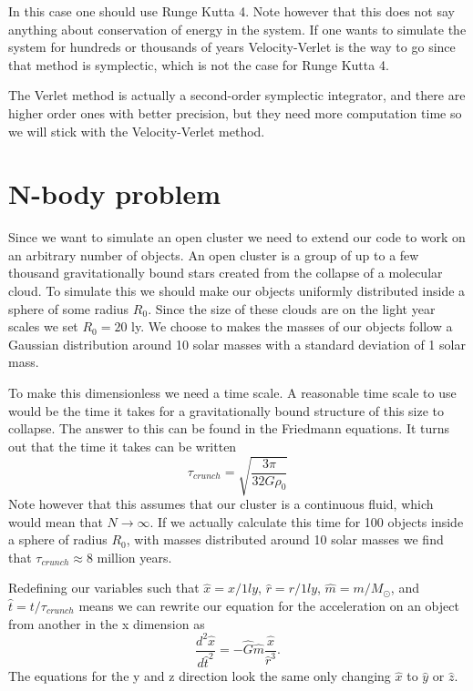 \documentclass{aa}   %
\begin{document}
In this case one should use Runge Kutta 4. Note however that this does not say anything about conservation of energy in the system. If one wants to simulate the system for hundreds or thousands of years Velocity-Verlet is the way to go since that method is symplectic, which is not the case for Runge Kutta 4. 

The Verlet method is actually a second-order symplectic integrator, and there are higher order ones with better precision, but they need more computation time so we will stick with the Velocity-Verlet method.
\section{N-body problem}    \label{sec:N-boy}
Since we want to simulate an open cluster we need to extend our code to work on an arbitrary number of objects.
An open cluster is a group of up to a few thousand gravitationally bound stars created from the collapse of a molecular cloud.
To simulate this we should make our objects uniformly distributed inside a sphere of some radius $R_0$. Since the size of these clouds are on the light year scales we set $R_0 = 20$ ly. We choose to makes the masses of our objects follow a Gaussian distribution around 10 solar masses with a standard deviation of 1 solar mass. 

To make this dimensionless we need a time scale. A reasonable time scale to use would be the time it takes for a gravitationally bound structure of this size to collapse. The answer to this can be found in the Friedmann equations.
It turns out that the time it takes can be written
\begin{equation}
 \tau_{crunch} = \sqrt{\frac{3\pi}{32G\rho_0}}
\end{equation}
Note however that this assumes that our cluster is a continuous fluid, which would mean that $N \rightarrow \infty$.
If we actually calculate this time for 100 objects inside a sphere of radius $R_0$, with masses distributed around 10 solar masses we find that $\tau_{crunch} \approx 8$ million years.


Redefining our variables such that $\hat x = x/1ly$, $\hat r= r/1ly$, $\hat m = m/M_\odot$, and $\hat t = t/\tau_{crunch}$ means we can rewrite our equation for the acceleration on an object from another in the x dimension as 
\begin{equation}
\frac{d^2 \hat x}{d\hat t^2} = -\hat G \hat m \frac{\hat x}{\hat r^3}.
\end{equation}
The equations for the y and z direction look the same only changing $\hat x$ to $\hat y$ or $\hat z$.
\end{document}
